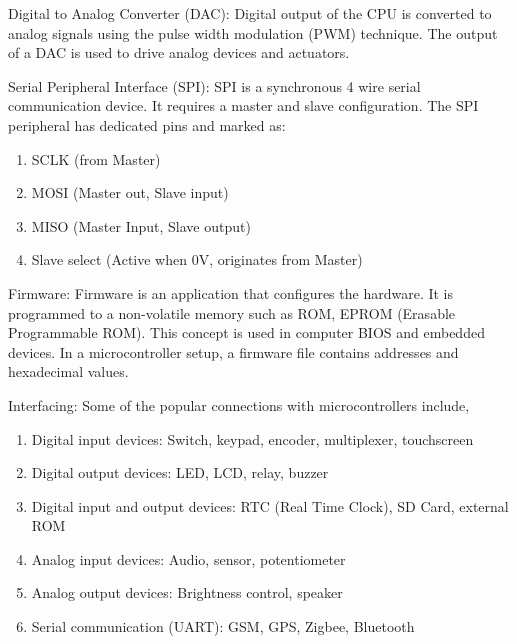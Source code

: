 \begin{description}
\item {Digital to Analog Converter (DAC):} Digital output of the CPU is
  converted to analog signals using the pulse width modulation (PWM)
  technique. The output of a DAC is used to drive analog devices and actuators.

\item {Serial Peripheral Interface (SPI):} SPI is a synchronous 4 wire
  serial communication device. It requires a master and slave
  configuration. The SPI peripheral has dedicated pins and marked
  as:
  \begin{enumerate}
  \item SCLK (from Master)
  \item MOSI (Master out, Slave input)
  \item MISO (Master Input, Slave output)
  \item Slave select (Active when 0V, originates from Master)
  \end{enumerate}

\item {Firmware:} Firmware is an application that configures the
  hardware. It is programmed to a non-volatile memory such as ROM,
  EPROM (Erasable Programmable ROM). This concept is used in computer
  BIOS and embedded devices.  In a microcontroller setup, a firmware
  file contains addresses and hexadecimal values.

\item{Interfacing:} Some of the popular connections with microcontrollers include,
  \begin{enumerate}
  \item Digital input devices: Switch, keypad, encoder, multiplexer,
    touchscreen
  \item Digital output devices: LED, LCD, relay, buzzer
  \item Digital input and output devices: RTC (Real Time Clock),
    SD Card, external ROM
  \item Analog input devices: Audio, sensor, potentiometer
  \item Analog output devices: Brightness control, speaker
  \item Serial communication (UART): GSM, GPS, Zigbee, Bluetooth
  \end{enumerate}
\end{description}

